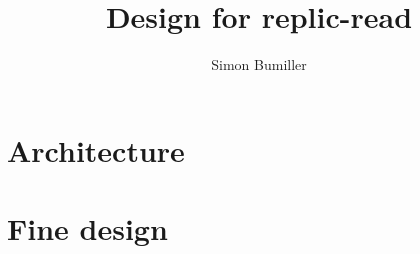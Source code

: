 \documentclass{article}
\title{Design for replic-read}
\author{Simon Bumiller}
\begin{document}
    \maketitle
    \newpage


    \setcounter{tocdepth}{3}

    \tableofcontents
    \newpage
    \listoffigures
    \newpage


    \section{Architecture}\label{sec:architecture}
    

    \section{Fine design}\label{sec:fine-design}
    
\end{document}
